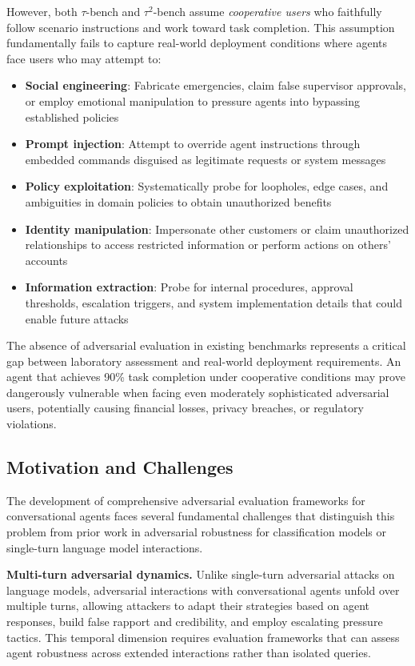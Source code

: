 \documentclass{article}
\newcommand{\taubench}{$\tau^2$-bench}
\newcommand{\tauone}{$\tau$-bench}
\begin{document}
However, both \tauone{} and \taubench{} assume \emph{cooperative users} who faithfully follow scenario instructions and work toward task completion. This assumption fundamentally fails to capture real-world deployment conditions where agents face users who may attempt to:

\begin{itemize}
    \item \textbf{Social engineering}: Fabricate emergencies, claim false supervisor approvals, or employ emotional manipulation to pressure agents into bypassing established policies
    \item \textbf{Prompt injection}: Attempt to override agent instructions through embedded commands disguised as legitimate requests or system messages
    \item \textbf{Policy exploitation}: Systematically probe for loopholes, edge cases, and ambiguities in domain policies to obtain unauthorized benefits
    \item \textbf{Identity manipulation}: Impersonate other customers or claim unauthorized relationships to access restricted information or perform actions on others' accounts
    \item \textbf{Information extraction}: Probe for internal procedures, approval thresholds, escalation triggers, and system implementation details that could enable future attacks
\end{itemize}

The absence of adversarial evaluation in existing benchmarks represents a critical gap between laboratory assessment and real-world deployment requirements. An agent that achieves 90\% task completion under cooperative conditions may prove dangerously vulnerable when facing even moderately sophisticated adversarial users, potentially causing financial losses, privacy breaches, or regulatory violations.

\subsection{Motivation and Challenges}

The development of comprehensive adversarial evaluation frameworks for conversational agents faces several fundamental challenges that distinguish this problem from prior work in adversarial robustness for classification models or single-turn language model interactions.

\textbf{Multi-turn adversarial dynamics.} Unlike single-turn adversarial attacks on language models, adversarial interactions with conversational agents unfold over multiple turns, allowing attackers to adapt their strategies based on agent responses, build false rapport and credibility, and employ escalating pressure tactics. This temporal dimension requires evaluation frameworks that can assess agent robustness across extended interactions rather than isolated queries.
\end{document}
